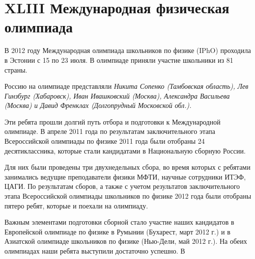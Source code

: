 \documentclass[a4paper,12pt]{article}
\begin{document}
\section*{\centering XLIII Международная физическая олимпиада}
\begin{multicols}{2}
    {\par \hspace*{0.2cm}В 2012 году Международная олимпиада школьников по физике (IPhO) проходила в Эстонии с 15 по 23 июля. В олимпиаде приняли участие школьники из 81 страны. }
    {\par \hspace*{0.2cm}Россию на олимпиаде представляли \textit{Никита Сопенко (Тамбовская область), Лев Гинзбург (Хабаровск), Иван Ивашковский (Москва), Александра Васильева (Москва) и Давид Френклах (Долгопрудный Московской обл.). }}
    {\par \hspace*{0.2cm}Эти ребята прошли долгий путь отбора и подготовки к Международной олимпиаде. В апреле 2011 года по результатам заключительного этапа Всероссийской олимпиады по физике 2011 года были отобраны 24 десятиклассника, которые стали кандидатами в Национальную сборную России. }
    {\par \hspace*{0.2cm}Для них были проведены три двухнедельных сбора, во время которых с ребятами занимались ведущие преподаватели физики МФТИ, научные сотрудники ИТЭФ, ЦАГИ. По результатам сборов, а также с учетом результатов заключительного этапа Всероссийской олимпиады школьников по физике 2012 года были отобраны пятеро ребят, которые и поехали на олимпиаду. }
    {\hspace*{0.9cm}Важным элементами подготовки сборной стало участие наших кандидатов в Европейской олимпиаде по физике в Румынии (Бухарест, март 2012 г.) и в Азиатской олимпиаде школьников по физике (Нью-Дели, май 2012 г.). На обеих олимпиадах наши ребята выступили достаточно успешно. В }
\end{multicols}
\end{document}
